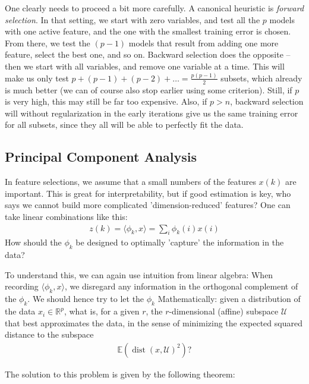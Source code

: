 \documentclass{article}
\newcommand{\sprod}[1]{\langle #1 \rangle}
\newcommand{\calU}{\mathcal{U}}
\newcommand{\R}{\mathbb{R}}
\DeclareMathOperator{\dist}{dist}
\begin{document}
One clearly needs to proceed a bit more carefully. A canonical heuristic is \emph{forward selection}. In that setting, we start with zero variables, and test all the $p$ models with one active feature, and the one with the smallest training error is chosen. From there, we test the $(p-1)$ models that result from adding one more feature, select the best one, and so on. Backward selection does the opposite -- then we start with all variables, and remove one variable at a time. This will make us only test $p + (p-1)+(p-2) + \dots = \frac{p(p-1)}{2}$ subsets, which already is much better (we can of course also stop earlier using some criterion). Still, if $p$ is very high, this may still be far too expensive. Also, if $p>n$, backward selection will without regularization in the early iterations give us the same training error for all subsets, since they all will be able to perfectly fit the data.





\subsection{Principal Component Analysis}
In feature selections, we assume that a small numbers of the features $x(k)$ are important. This is great for interpretability, but if good estimation is key, who says we cannot build more complicated 'dimension-reduced' features? One can take linear combinations like this:
\begin{align*}
    z(k) = \sprod{\phi_k , x} = \sum_i \phi_k(i)x(i)
\end{align*}
How should the $\phi_k$ be designed to optimally 'capture' the information in the data? 

To understand this, we can again use intuition from linear algebra: When recording $\sprod{\phi_k,x}$, we disregard any information in the orthogonal complement of the $\phi_k$. We should hence try to let the $\phi_k$  Mathematically: given a distribution of the data $x_i \in \R^p$, what is, for a given $r$, the $r$-dimensional (affine) subspace $\calU$ that best approximates the data, in the sense of minimizing the expected squared distance to the subspace
\begin{align*}
    \mathbb{E}(\dist(x,\calU)^2)?
\end{align*}

The solution to this problem is given by the following theorem:
\end{document}
